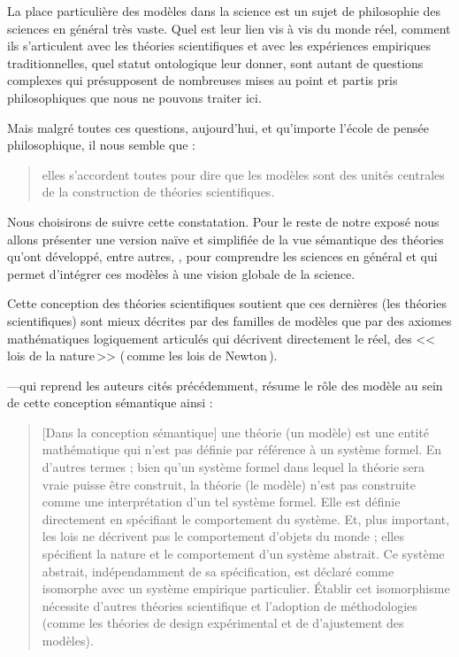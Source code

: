 La place particulière des modèles dans la science est un sujet de philosophie des sciences en général très vaste. Quel est leur lien vis à vis du monde réel, comment ils s'articulent avec les théories scientifiques et avec les expériences empiriques traditionnelles, quel statut ontologique leur donner, sont autant de questions complexes qui présupposent de nombreuses mises au point et partis pris philosophiques que nous ne pouvons traiter ici.

Mais malgré toutes ces questions, aujourd'hui, et qu'importe l'école de pensée philosophique, il nous semble que :
\begin{quote}
	elles s'accordent toutes pour dire que les modèles sont des unités centrales de la construction de théories scientifiques.\\ \citep{frigg2012modelsinscience}
\end{quote}

Nous choisirons de suivre cette constatation. Pour le reste de notre exposé nous allons présenter une version naïve et simplifiée de la vue sémantique des théories qu'ont développé, entre autres, \cite{suppe1989thesemanticconceptionoftheoriesandscientificrealism,vanfraassen1980thescientificimage}, pour comprendre les sciences en général et qui permet d'intégrer ces modèles à une vision globale de la science.

Cette conception des théories scientifiques soutient que ces dernières (les théories scientifiques) sont mieux décrites par des familles de modèles que par des axiomes mathématiques logiquement articulés qui décrivent directement le réel, des <<\,lois de la nature\,>> (\,comme les lois de Newton\,). 

\cite{thompson1989thestructureofbiologicaltheories} ---qui reprend les auteurs cités précédemment, résume le rôle des modèle au sein de cette conception sémantique ainsi :

\begin{quotation}
	[Dans la conception sémantique] une théorie (un modèle) est une entité mathématique qui n'est pas définie par référence à un système formel. En d'autres termes ; bien qu'un système formel dans lequel la théorie sera vraie puisse être construit, la théorie (le modèle) n'est pas construite comme une interprétation d'un tel système formel. Elle est définie directement en spécifiant le comportement du système. Et, plus important, les lois ne décrivent pas le comportement d'objets du monde ; elles spécifient la nature et le comportement d'un système abstrait. Ce système abstrait, indépendamment de sa spécification, est déclaré comme isomorphe avec un système empirique particulier. \'Etablir cet isomorphisme nécessite d'autres théories scientifique et l'adoption de méthodologies (comme les théories de design expérimental et de d'ajustement des modèles).\\
	\citep[p. 72]{thompson1989thestructureofbiologicaltheories}
\end{quotation}

